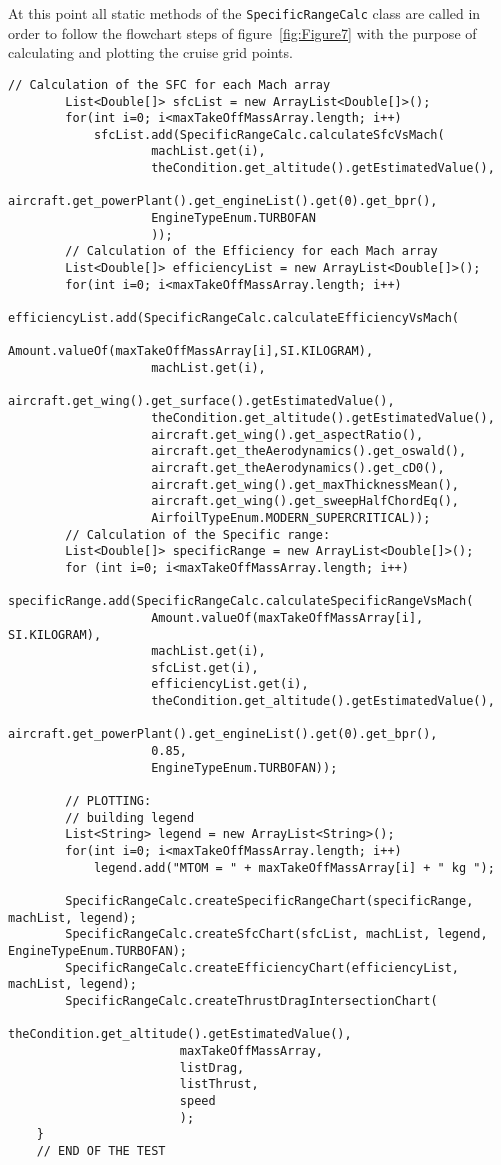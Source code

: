 \bigskip
\noindent
At this point all static methods of the \lstinline[language=Java]!SpecificRangeCalc! class are called in order to follow the flowchart steps of figure~\ref{fig:Figure7} with the purpose of calculating and plotting the cruise grid points.

\bigskip
\begin{lstlisting}[caption={Intersection of drag and thrust curves in Specific Range test - B747-100B}, captionpos=b, tabsize=2]
		// Calculation of the SFC for each Mach array
		List<Double[]> sfcList = new ArrayList<Double[]>();
		for(int i=0; i<maxTakeOffMassArray.length; i++)
			sfcList.add(SpecificRangeCalc.calculateSfcVsMach(
					machList.get(i),
					theCondition.get_altitude().getEstimatedValue(),
					aircraft.get_powerPlant().get_engineList().get(0).get_bpr(),
					EngineTypeEnum.TURBOFAN
					));
		// Calculation of the Efficiency for each Mach array
		List<Double[]> efficiencyList = new ArrayList<Double[]>();
		for(int i=0; i<maxTakeOffMassArray.length; i++)
			efficiencyList.add(SpecificRangeCalc.calculateEfficiencyVsMach(
					Amount.valueOf(maxTakeOffMassArray[i],SI.KILOGRAM),
					machList.get(i),
					aircraft.get_wing().get_surface().getEstimatedValue(),
					theCondition.get_altitude().getEstimatedValue(),
					aircraft.get_wing().get_aspectRatio(),
					aircraft.get_theAerodynamics().get_oswald(),
					aircraft.get_theAerodynamics().get_cD0(),
					aircraft.get_wing().get_maxThicknessMean(),
					aircraft.get_wing().get_sweepHalfChordEq(),
					AirfoilTypeEnum.MODERN_SUPERCRITICAL));
		// Calculation of the Specific range:
		List<Double[]> specificRange = new ArrayList<Double[]>();
		for (int i=0; i<maxTakeOffMassArray.length; i++)
			specificRange.add(SpecificRangeCalc.calculateSpecificRangeVsMach(
					Amount.valueOf(maxTakeOffMassArray[i], SI.KILOGRAM),
					machList.get(i),
					sfcList.get(i),
					efficiencyList.get(i),
					theCondition.get_altitude().getEstimatedValue(),
					aircraft.get_powerPlant().get_engineList().get(0).get_bpr(),
					0.85,
					EngineTypeEnum.TURBOFAN));
	
		// PLOTTING:			
		// building legend
		List<String> legend = new ArrayList<String>();
		for(int i=0; i<maxTakeOffMassArray.length; i++)
			legend.add("MTOM = " + maxTakeOffMassArray[i] + " kg ");
		
		SpecificRangeCalc.createSpecificRangeChart(specificRange, machList, legend);
		SpecificRangeCalc.createSfcChart(sfcList, machList, legend, EngineTypeEnum.TURBOFAN);
		SpecificRangeCalc.createEfficiencyChart(efficiencyList, machList, legend);
		SpecificRangeCalc.createThrustDragIntersectionChart(
						theCondition.get_altitude().getEstimatedValue(),
						maxTakeOffMassArray,
						listDrag,
						listThrust,
						speed
						);	
	}
	// END OF THE TEST
\end{lstlisting}

